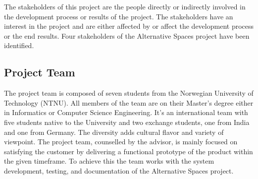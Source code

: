 The stakeholders of this project are the people directly or indirectly involved in the development process or results of the project. The stakeholders have an interest in the project and are either affected by or affect the development process or the end results. Four stakeholders of the Alternative Spaces project have been identified.

\subsection{Project Team}
\label{subsec:IntroStakeProjectTeam}

The project team is composed of seven students from the Norwegian University of Technology (NTNU). All members of the team are on their Master's degree either in Informatics or Computer Science Engineering. It's an international team with five students native to the University and two exchange students, one from India and one from Germany. The diversity adds cultural flavor and variety of viewpoint. The project team, counselled by the advisor, is mainly focused on satisfying the customer by delivering a functional prototype of the product within the given timeframe. To achieve this the team works with the system development, testing, and documentation of the Alternative Spaces project.


